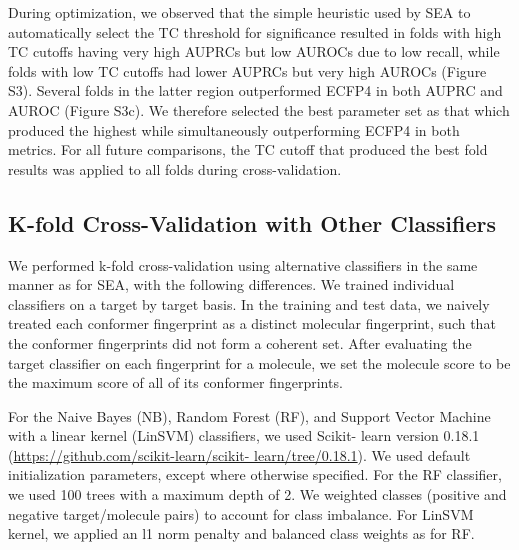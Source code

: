 \documentclass[../../main.tex]{subfiles}
\begin{document}
\begin{refsection}
	During optimization, we observed that the simple heuristic used by SEA to automatically select the TC threshold for significance resulted in folds with high TC cutoffs having very high AUPRCs but low AUROCs due to low recall, while folds with low TC cutoffs had lower AUPRCs but very high AUROCs (Figure S3).
	Several folds in the latter region outperformed ECFP4 in both AUPRC and AUROC (Figure S3c).
	We therefore selected the best parameter set as that which produced the highest  \AUCsum{} while simultaneously outperforming ECFP4 in both metrics.
	For all future comparisons, the TC cutoff that produced the best fold results was applied to all folds during cross-validation.

	\subsection*{K-fold Cross-Validation with Other Classifiers}

	We performed k-fold cross-validation using alternative classifiers in the same manner as for SEA, with the following differences.
	We trained individual classifiers on a target by target basis.
	In the training and test data, we naively treated each conformer fingerprint as a distinct molecular fingerprint, such that the conformer fingerprints did not form a coherent set.
	After evaluating the target classifier on each fingerprint for a molecule, we set the molecule score to be the maximum score of all of its conformer fingerprints.

	For the Naive Bayes (NB), Random Forest (RF), and Support Vector Machine with a linear kernel (LinSVM) classifiers, we used Scikit- learn version 0.18.1 (\url{https://github.com/scikit-learn/scikit- learn/tree/0.18.1}).
	We used default initialization parameters, except where otherwise specified.
	For the RF classifier, we used 100 trees with a maximum depth of 2.
	We weighted classes (positive and negative target/molecule pairs) to account for class imbalance.
	For LinSVM kernel, we applied an l1 norm penalty and balanced class weights as for RF.


\end{refsection}
\end{document}

